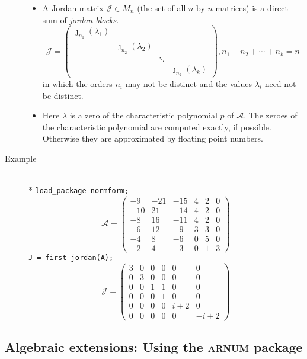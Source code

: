 \begin{description}
\begin{itemize}
\item A Jordan matrix $\mathcal{J} \in M_{n}$ (the set of all $n$ by $n$
      matrices) is a direct sum of {\it jordan blocks}.
%
      \[
      \mathcal{J} = \begin{pmatrix} \jmath_{n_1}(\lambda_{1})
      \\  & \jmath_{n_2}(\lambda_{2}) \\ & & \ddots \\ & & &
      \jmath_{n_k}(\lambda_{k}) \end{pmatrix},
       n_{1}+ n_{2}+\cdots +n_{k} = n
      \]
%
      in which the orders $n_{i}$ may not be distinct and the
      values ${\lambda_{i}}$ need not be distinct.

\item Here ${\lambda}$ is a zero of the characteristic polynomial
      $p$ of $\mathcal{A}$. The zeroes of the characteristic
      polynomial are computed exactly, if possible. Otherwise they are
      approximated by floating point numbers.
\end{itemize}

\item[Example]\mbox{}\\*
%
\texttt{load\_package normform;}
\[
\mathcal{A} = \begin{pmatrix} -9 & -21 & -15 & 4 & 2 & 0 \\
-10 & 21 & -14 & 4 & 2 & 0 \\ -8 & 16 & -11 & 4 & 2 & 0 \\ -6 & 12 & -9
& 3 & 3 & 0 \\ -4 & 8 & -6 & 0 & 5 & 0 \\ -2 & 4 & -3 & 0 & 1 & 3
\end{pmatrix}
\]
\texttt{J = first jordan(A);}
\[
\mathcal{J} = \begin{pmatrix} 3 & 0 & 0 & 0 & 0 & 0 \\ 0 & 3
& 0 & 0 & 0 & 0 \\ 0 & 0 & 1 & 1 & 0 & 0 \\ 0 & 0 & 0 & 1 & 0 & 0 \\
 0 & 0 & 0 & 0 & i+2 & 0 \\ 0 & 0 & 0 & 0 & 0 & -i+2
\end{pmatrix}
\]
\end{description}


\subsection{Algebraic extensions: Using the \textsc{arnum} package}
\label{sec:normform-arnum}


